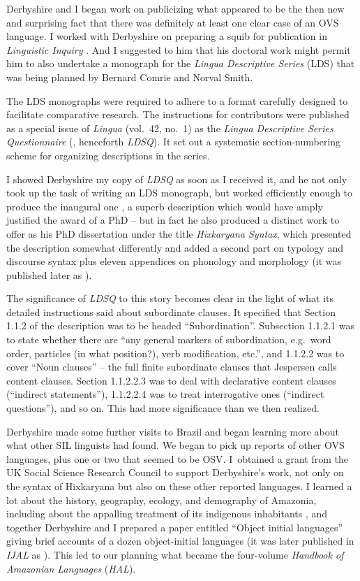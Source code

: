 \documentclass[output=paper,colorlinks,citecolor=brown
]{langscibook}
\begin{document}
Derbyshire and I began work on publicizing what appeared to be the then
new and surprising fact that there was definitely at least one clear
case of an OVS language. I worked with Derbyshire on preparing a squib
for publication in \textit{Linguistic Inquiry} \citep{Derbyshire77}.
And I suggested to him that his doctoral work might permit him to
also undertake a monograph for the \textit{Lingua Descriptive Series} (LDS)
that was being planned by Bernard Comrie and Norval Smith.

The LDS monographs were required to adhere to a format carefully designed
to facilitate comparative research. The instructions for contributors
were published as a special issue of \textit{Lingua} (vol.~42, no.~1)
as the \textit{Lingua Descriptive Series Questionnaire}
(\citealt{ComrSmit77}, henceforth \textit{LDSQ}). It set out a systematic
section-numbering scheme for organizing descriptions in the series.

I showed Derbyshire my copy of \textit{LDSQ} as soon as I received it, and
he not only took up the task of writing an LDS monograph, but worked
efficiently enough to produce the inaugural one \citep{Derbyshire79},
a superb description which would have amply justified the award of a
PhD -- but in fact he also produced a distinct work to offer as his
PhD dissertation under the title \textit{Hixkaryana Syntax}, which
presented the description somewhat differently and added a second
part on typology and discourse syntax plus eleven appendices on
phonology and morphology (it was published later as
\citealt{Derbyshire85}).

The significance of \textit{LDSQ} to this story becomes clear in
the light of what its detailed instructions said about subordinate
clauses. It specified that Section 1.1.2 of the description was to
be headed ``Subordination''. Subsection 1.1.2.1 was to state whether
there are ``any general markers of subordination, e.g.\ word order,
particles (in what position?), verb modification, etc.'', and 1.1.2.2
was to cover ``Noun clauses'' -- the full finite subordinate clauses
that Jespersen calls content clauses. Section 1.1.2.2.3 was to deal
with declarative content clauses (``indirect statements''), 1.1.2.2.4
was to treat interrogative ones (``indirect questions''), and so on.
This had more significance than we then realized.

Derbyshire made some further visits to Brazil and began learning more about
what other SIL linguists had found. We began to pick up reports of
other OVS languages, plus one or two that seemed to be OSV. I~obtained
a grant from the UK Social Science Research Council to support Derbyshire's
work, not only on the syntax of Hixkaryana but also on these other
reported languages. I learned a lot about the history, geography,
ecology, and demography of Amazonia, including about the appalling
treatment of its indigenous inhabitants \citep{Pullum78}, and together
Derbyshire and I prepared a paper entitled ``Object initial languages'' giving
brief accounts of a dozen object-initial languages (it was later
published in \textit{IJAL} as \citealt{DerbPull81}). This led to our
planning what became the four-volume \textit{Handbook of Amazonian
Languages} (\textit{HAL}).
\end{document}
